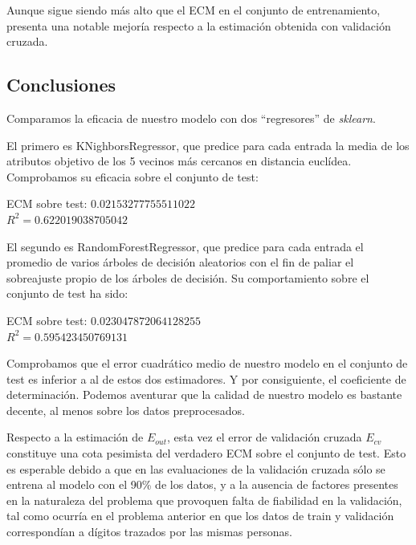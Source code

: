 \documentclass[a4]{article}
\begin{document}
Aunque sigue siendo más alto que el ECM en el conjunto de
entrenamiento, presenta una notable mejoría respecto a la estimación
obtenida con validación cruzada.


\subsection{Conclusiones}

Comparamos la eficacia de nuestro modelo con dos ``regresores'' de
\textit{sklearn}.

El primero es KNighborsRegressor, que predice para cada entrada la
media de los atributos objetivo de los 5 vecinos más cercanos en
distancia euclídea. Comprobamos su eficacia sobre el conjunto de test:

ECM sobre test: $0.02153277755511022$ \\
$R^2= 0.622019038705042$

El segundo es RandomForestRegressor, que predice para cada entrada el
promedio de varios árboles de decisión aleatorios con el fin de paliar
el sobreajuste propio de los árboles de decisión. Su comportamiento
sobre el conjunto de test ha sido:

ECM sobre test: $0.023047872064128255$ \\
$R^2= 0.595423450769131$

Comprobamos que el error cuadrático medio de nuestro modelo en el
conjunto de test es inferior a al de estos dos estimadores. Y por
consiguiente, el coeficiente de determinación. Podemos aventurar que
la calidad de nuestro modelo es bastante decente, al menos sobre los
datos preprocesados.

Respecto a la estimación de $E_{out}$, esta vez el error de validación
cruzada $E_{cv}$ constituye una cota pesimista del verdadero ECM sobre
el conjunto de test. Esto es esperable debido a que en las
evaluaciones de la validación cruzada sólo se entrena al modelo con el
90\% de los datos, y a la ausencia de factores presentes en la
naturaleza del problema que provoquen falta de fiabilidad en la
validación, tal como ocurría en el problema anterior en que los datos
de train y validación correspondían a dígitos trazados por las mismas
personas. 
\end{document}
